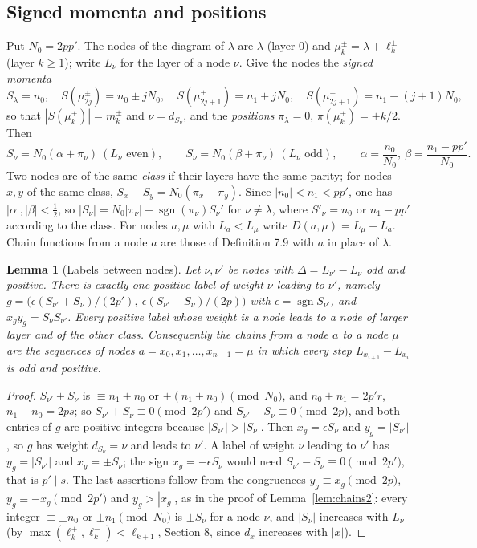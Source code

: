 \documentclass[11pt]{article}
\newtheorem{lemma}[theorem]{Lemma}
\theoremstyle{remark}
\begin{document}
\subsection*{Signed momenta and positions}
Put $N_0=2pp'$.  The nodes of the diagram of $\lambda$ are $\lambda$ (layer
$0$) and $\mu^\pm_k=\lambda+\ell^\pm_k$ (layer $k\ge1$); write $L_\nu$ for the
layer of a node $\nu$.  Give the nodes the \emph{signed momenta}
\[
 S_\lambda=n_0,\quad S(\mu^\pm_{2j})=n_0\pm jN_0,\quad
 S(\mu^+_{2j+1})=n_1+jN_0,\quad S(\mu^-_{2j+1})=n_1-(j+1)N_0,
\]
so that $|S(\mu^\pm_k)|=m^\pm_k$ and $\nu=d_{S_\nu}$, and the
\emph{positions} $\pi_\lambda=0$, $\pi(\mu^\pm_k)=\pm k/2$.  Then
\[
 S_\nu=N_0(\alpha+\pi_\nu)\ (L_\nu\text{ even}),\qquad
 S_\nu=N_0(\beta+\pi_\nu)\ (L_\nu\text{ odd}),\qquad
 \alpha=\frac{n_0}{N_0},\ \beta=\frac{n_1-pp'}{N_0}.
\]
Two nodes are of the same \emph{class} if their layers have the same parity;
for nodes $x,y$ of the same class, $S_x-S_y=N_0(\pi_x-\pi_y)$.  Since
$|n_0|<n_1<pp'$, one has $|\alpha|,|\beta|<\frac12$, so
$|S_\nu|=N_0|\pi_\nu|+\operatorname{sgn}(\pi_\nu)S_\nu'$ for $\nu\ne\lambda$,
where $S'_\nu=n_0$ or $n_1-pp'$ according to the class.  For nodes $a,\mu$
with $L_a<L_\mu$ write $D(a,\mu)=L_\mu-L_a$.  Chain functions from a node $a$
are those of Definition 7.9 with $a$ in place of $\lambda$.

\begin{lemma}[Labels between nodes]\label{lem:labels}
Let $\nu,\nu'$ be nodes with $\Delta=L_{\nu'}-L_\nu$ odd and positive.  There
is exactly one positive label of weight $\nu$ leading to $\nu'$, namely
$g=\bigl(\epsilon(S_{\nu'}+S_\nu)/(2p'),\ \epsilon(S_{\nu'}-S_\nu)/(2p)\bigr)$
with $\epsilon=\operatorname{sgn}S_{\nu'}$, and $x_gy_g=S_\nu S_{\nu'}$.  Every
positive label whose weight is a node leads to a node of larger layer and of
the other class.  Consequently the chains from a node $a$ to a node $\mu$ are
the sequences of nodes $a=x_0,x_1,\dots,x_{n+1}=\mu$ in which every step
$L_{x_{i+1}}-L_{x_i}$ is odd and positive.
\end{lemma}

\begin{proof}
$S_{\nu'}\pm S_\nu$ is $\equiv n_1\pm n_0$ or $\pm(n_1\pm n_0)\pmod{N_0}$, and
$n_0+n_1=2p'r$, $n_1-n_0=2ps$; so $S_{\nu'}+S_\nu\equiv0\pmod{2p'}$ and
$S_{\nu'}-S_\nu\equiv0\pmod{2p}$, and both entries of $g$ are positive
integers because $|S_{\nu'}|>|S_\nu|$.  Then $x_g=\epsilon S_\nu$ and
$y_g=|S_{\nu'}|$, so $g$ has weight $d_{S_\nu}=\nu$ and leads to $\nu'$.  A
label of weight $\nu$ leading to $\nu'$ has $y_g=|S_{\nu'}|$ and
$x_g=\pm S_\nu$; the sign $x_g=-\epsilon S_\nu$ would need
$S_{\nu'}-S_\nu\equiv0\pmod{2p'}$, that is $p'\mid s$.  The last assertions
follow from the congruences $y_g\equiv x_g\pmod{2p}$,
$y_g\equiv-x_g\pmod{2p'}$ and $y_g>|x_g|$, as in the proof of
Lemma~\ref{lem:chains2}: every integer $\equiv\pm n_0$ or $\pm n_1\pmod{N_0}$
is $\pm S_\nu$ for a node $\nu$, and $|S_\nu|$ increases with $L_\nu$ (by
$\max(\ell^+_k,\ell^-_k)<\ell_{k+1}$, Section 8, since $d_x$ increases with $|x|$).
\end{proof}
\end{document}
